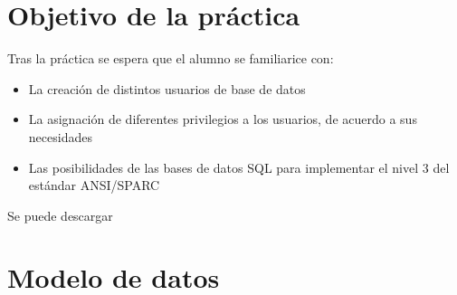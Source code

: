 
\usepackage{eurosym}




\renewcommand{\hmwkTitle}{Modificación concurente de datos}
\renewcommand{\hmwkClass}{Gestión de Bases de Datos}

\usepackage{enumitem}%


\setlength{\columnseprule}{0.4pt}
\newcommand{\Simultaneo}[2]{
  \begin{multicols}{2}
    \vfill \null
    #1
    \vfill \null
    \columnbreak
    \vfill \null
    #2
    \vfill \null
  \end{multicols}
}






\primerapagina


\section{Objetivo de la práctica}
Tras la práctica se espera que el alumno se familiarice con:
\begin{itemize}
\item La creación de distintos usuarios de base de datos
\item La asignación de diferentes privilegios a los usuarios, de acuerdo a sus necesidades
\item Las posibilidades de las bases de datos SQL para implementar el nivel 3 del estándar ANSI/SPARC
\end{itemize}

Se puede descargar 

\section{Modelo de datos}

